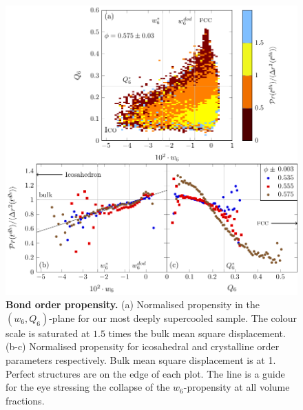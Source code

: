 \begin{figure}
\begin{center}
\includegraphics{generate_figures-figure2.pdf}
\end{center}
\caption{\textbf{Bond order propensity.} (a) Normalised propensity in the $(w_6, Q_6)$-plane for our most deeply supercooled sample. The colour scale is saturated at $1.5$ times the bulk mean square displacement. (b-c) Normalised propensity for icosahedral and crystalline order parameters respectively. Bulk mean square displacement is at 1. Perfect structures are on the edge of each plot. The line is a guide for the eye stressing the collapse of the $w_6$-propensity at all volume fractions.}
	\label{fig:msd_Q6_w6}
\end{figure}

\clearpage

